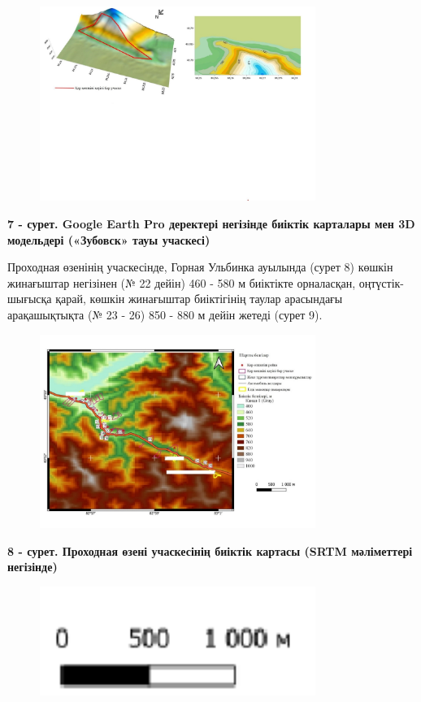 \begin{figure}[H]
	\centering
	\includegraphics[width=0.8\textwidth]{media/ict2/image210}
	\caption*{}
\end{figure}


{\bfseries 7 - сурет. Google Earth Pro деректері негізінде биіктік
карталары мен 3D модельдері («Зубовск» тауы учаскесі)}

Проходная өзенінің учаскесінде, Горная Ульбинка ауылында (сурет 8)
көшкін жинағыштар негізінен (№ 22 дейін) 460 - 580 м биіктікте
орналасқан, оңтүстік-шығысқа қарай, көшкін жинағыштар биіктігінің таулар
арасындағы арақашықтықта (№ 23 - 26) 850 - 880 м дейін жетеді (сурет 9).


\begin{figure}[H]
	\centering
	\includegraphics[width=0.8\textwidth]{media/ict2/image211}
	\caption*{}
\end{figure}


{\bfseries 8 - сурет. Проходная өзені учаскесінің биіктік картасы (SRTM
мәліметтері негізінде)}


\begin{figure}[H]
	\centering
	\includegraphics[width=0.8\textwidth]{media/ict2/image209}
	\caption*{}
\end{figure}

